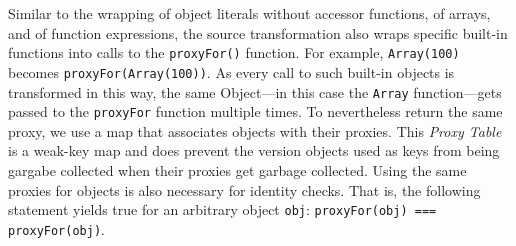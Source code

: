 Similar to the wrapping of object literals without accessor functions, of arrays, and of function expressions, the source transformation also wraps specific built-in functions into calls to the \lstinline{proxyFor()} function.
For example, \lstinline{Array(100)} becomes \lstinline{proxyFor(Array(100))}.
As every call to such built-in objects is transformed in this way, the same Object---in this case the \lstinline{Array} function---gets passed to the \lstinline{proxyFor} function multiple times.
To nevertheless return the same proxy, we use a map that associates objects with their proxies.
This \emph{Proxy Table} is a weak-key map and does prevent the version objects used as keys from being gargabe collected when their proxies get garbage collected.
Using the same proxies for objects is also necessary for identity checks.
That is, the following statement yields true for an arbitrary object \lstinline{obj}: \lstinline{proxyFor(obj) === proxyFor(obj)}.













